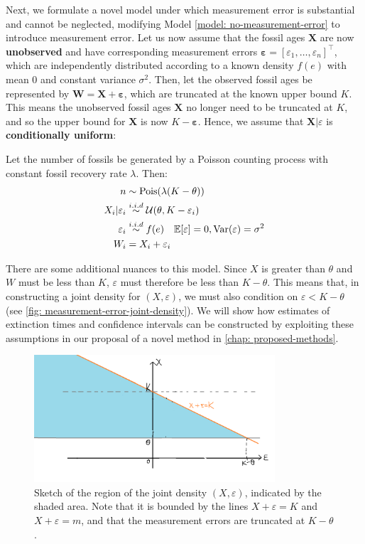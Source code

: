 Next, we formulate a novel model under which measurement error is substantial and cannot be neglected, modifying Model \ref{model: no-measurement-error} to introduce measurement error. Let us now assume that the fossil ages $\bm{X}$ are now \textbf{unobserved} and have corresponding measurement errors $\bm{\varepsilon} = [\varepsilon_1, \dots, \varepsilon_n]^\top$, which are independently distributed according to a known density $f(e)$ with mean 0 and constant variance $\sigma^2$. Then, let the observed fossil ages be represented by $\bm{W} = \bm{X} + \bm{\varepsilon}$, which are truncated at the known upper bound $K$. This means the unobserved fossil ages $\bm{X}$ no longer need to be truncated at $K$, and so the upper bound for $\bm{X}$ is now $K-\bm{\varepsilon}$. Hence, we assume that $\bm{X}|\varepsilon$ is \textbf{conditionally uniform}:
\begin{model}\label{model: measurement-error}
    Let the number of fossils be generated by a Poisson counting process with constant fossil recovery rate $\lambda$. Then:
    \begin{align*}
        n &\sim \textrm{Pois}(\lambda(K-\theta)) \\
        X_i | \varepsilon_i &\overset{i.i.d}{\sim} \mathcal{U}(\theta, K-\varepsilon_i) \\
        \varepsilon_i &\overset{i.i.d}{\sim} f(e) \quad \mathbb{E}[\varepsilon] = 0, \mathrm{Var}(\varepsilon) = \sigma^2 \\
        W_i &= X_i + \varepsilon_i 
    \end{align*}
\end{model}

There are some additional nuances to this model. Since $X$ is greater than $\theta$ and $W$ must be less than $K$, $\varepsilon$ must therefore be less than $K - \theta$. This means that, in constructing a joint density for $(X, \varepsilon)$, we must also condition on $\varepsilon < K - \theta$ (see \autoref{fig: measurement-error-joint-density}). We will show how estimates of extinction times and confidence intervals can be constructed by exploiting these assumptions in our proposal of a novel method in \autoref{chap: proposed-methods}.
\begin{figure}[ht]
    \centering
    \includegraphics[width=0.8\textwidth]{figures/measurement-error-joint-density.png}
    \caption{Sketch of the region of the joint density $(X, \varepsilon)$, indicated by the shaded area. Note that it is bounded by the lines $X+\varepsilon = K$ and $X + \varepsilon = m$, and that the measurement errors are truncated at $K-\theta$.}
    \label{fig: measurement-error-joint-density}
\end{figure}

